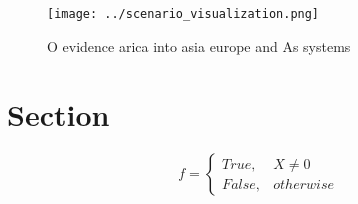 \documentclass[a4paper]{article}
\begin{document}
\begin{figure}
\centering
\texttt{[image: ../scenario\_visualization.png]}
\caption{O evidence arica into asia europe and As systems 
}
\end{figure}
 
\section{Section}

\begin{equation}   f =
\begin{cases} True, & X \neq 0\\
False, & otherwise
\end{cases}
\end{equation}
\end{document}
